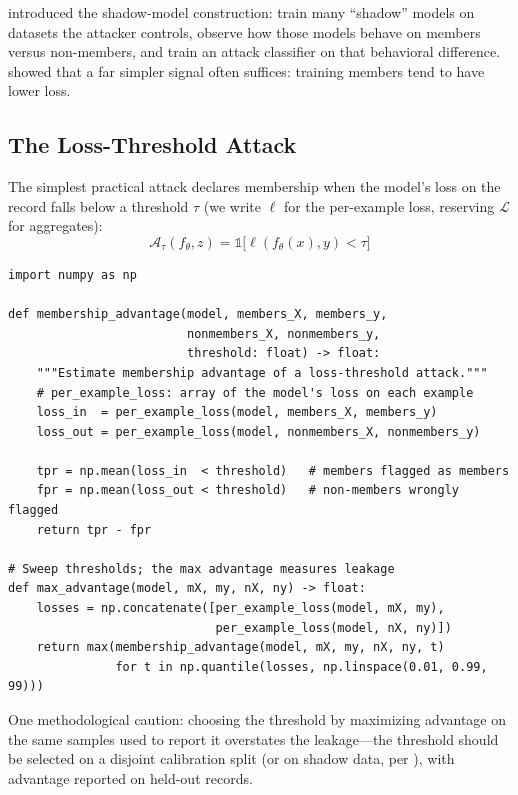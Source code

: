 \textcite{shokri2017membership} introduced the shadow-model construction: train many ``shadow'' models on datasets the attacker controls, observe how those models behave on members versus non-members, and train an attack classifier on that behavioral difference. \textcite{yeom2018privacy} showed that a far simpler signal often suffices: training members tend to have lower loss.

\subsection{The Loss-Threshold Attack}

The simplest practical attack declares membership when the model's loss on the record falls below a threshold $\tau$ (we write $\ell$ for the per-example loss, reserving $\mathcal{L}$ for aggregates):
\[
\mathcal{A}_\tau(f_\theta, z) = \mathbb{1}\bigl[\ell(f_\theta(x), y) < \tau\bigr]
\]

\begin{lstlisting}[style=python, caption={Loss-threshold membership inference audit}]
import numpy as np

def membership_advantage(model, members_X, members_y,
                         nonmembers_X, nonmembers_y,
                         threshold: float) -> float:
    """Estimate membership advantage of a loss-threshold attack."""
    # per_example_loss: array of the model's loss on each example
    loss_in  = per_example_loss(model, members_X, members_y)
    loss_out = per_example_loss(model, nonmembers_X, nonmembers_y)

    tpr = np.mean(loss_in  < threshold)   # members flagged as members
    fpr = np.mean(loss_out < threshold)   # non-members wrongly flagged
    return tpr - fpr

# Sweep thresholds; the max advantage measures leakage
def max_advantage(model, mX, my, nX, ny) -> float:
    losses = np.concatenate([per_example_loss(model, mX, my),
                             per_example_loss(model, nX, ny)])
    return max(membership_advantage(model, mX, my, nX, ny, t)
               for t in np.quantile(losses, np.linspace(0.01, 0.99, 99)))
\end{lstlisting}

One methodological caution: choosing the threshold by maximizing advantage on the same samples used to report it overstates the leakage---the threshold should be selected on a disjoint calibration split (or on shadow data, per \textcite{shokri2017membership}), with advantage reported on held-out records.


